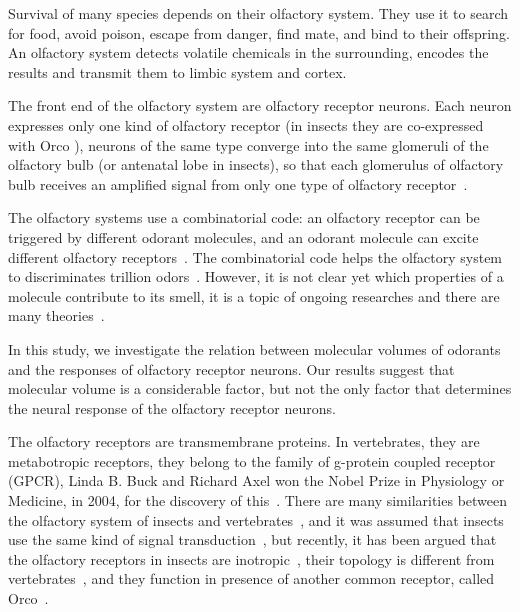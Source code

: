 \documentclass[11pt]{paper} %
\begin{document}
Survival of many species depends on their olfactory system. 
They use it  to search for food, 
avoid poison, 
escape from danger, 
find mate, 
and bind to their offspring.
An olfactory system detects volatile chemicals in the surrounding, 
encodes the results and transmit them to limbic system and cortex.

The front end of the olfactory system are olfactory receptor neurons.  
Each neuron expresses only one kind of olfactory receptor (in insects they are co-expressed with Orco \cite{Larsson2004}),
neurons of the same type converge into the same glomeruli of the olfactory bulb (or antenatal lobe in insects),
so that each glomerulus of olfactory bulb receives an amplified signal from only one type of olfactory receptor~\cite{root2007,Carey2011,Vosshall2000,Couto2005,fishilevich2005,gao2000,wang1998,mombaerts1996,vassar1994}.

The olfactory systems use a combinatorial code: 
an olfactory receptor can be triggered by different odorant molecules, 
and an odorant molecule can excite different olfactory receptors~\cite{Malnic2000}.
The combinatorial code helps the olfactory system to discriminates trillion odors~\cite{Bushdid2014}.
However, it is not clear yet which properties of a molecule contribute to its smell,
it is a topic of ongoing researches and there are many theories~\cite{Turin,Keller2004,Araneda2000,Brookes2007,Franco2011,Pelz2006,Gabler2013,Schmuker2007,Haddad2008,Snitz2013,Yablonka2012,gane2013}.

In this study, 
we investigate the relation between molecular volumes of odorants and the responses of olfactory receptor neurons. 
Our results suggest that molecular volume is a considerable factor, 
but not the only factor that determines the neural response of the olfactory receptor neurons.

The olfactory receptors are transmembrane proteins.
In vertebrates, they are metabotropic receptors, they belong to the family of g-protein coupled receptor (GPCR), 
Linda B. Buck and Richard Axel won the Nobel Prize in Physiology or Medicine, in 2004, 
for the discovery of this~\cite{Buck1991}.
There are many similarities between the olfactory system of insects and vertebrates~\cite{Wilson2014,Kaupp2010}, 
and it was assumed that insects use the same kind of signal transduction~\cite{Brody2000,Hill04102002}, 
but recently, it has been argued that the olfactory receptors in insects are inotropic~\cite{Sato2008,Wicher2008,Nagel2011,Rong2011}, 
their topology is different from vertebrates~\cite{Benton2007,Smart2008},
and they function in presence of another common receptor, called Orco~\cite{Larsson2004}.
\end{document}

